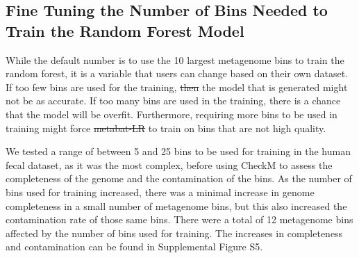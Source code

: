 \documentclass[fleqn,10pt,lineno]{wlpeerj}
\providecommand{\DIFaddtex}[1]{{\protect\color{blue}\uwave{#1}}} %
\providecommand{\DIFdeltex}[1]{{\protect\color{red}\sout{#1}}}                      %
\providecommand{\DIFaddbegin}{} %
\providecommand{\DIFaddend}{} %
\providecommand{\DIFdelbegin}{} %
\providecommand{\DIFdelend}{} %
\providecommand{\DIFadd}[1]{\texorpdfstring{\DIFaddtex{#1}}{#1}} %
\providecommand{\DIFdel}[1]{\texorpdfstring{\DIFdeltex{#1}}{}} %
\newcommand{\DIFscaledelfig}{0.5}
\newlength{\DIFdelgraphicswidth} %
\newlength{\DIFdelgraphicsheight} %
\newcommand{\DIFaddincludegraphics}[2][]{{\color{blue}\fbox{\DIFOincludegraphics[#1]{#2}}}} %
\newcommand{\DIFdelincludegraphics}[2][]{%
\sbox{\DIFdelgraphicsbox}{\DIFOincludegraphics[#1]{#2}}%
\settoboxwidth{\DIFdelgraphicswidth}{\DIFdelgraphicsbox} %
\settoboxtotalheight{\DIFdelgraphicsheight}{\DIFdelgraphicsbox} %
\scalebox{\DIFscaledelfig}{%
\parbox[b]{\DIFdelgraphicswidth}{\usebox{\DIFdelgraphicsbox}\\[-\baselineskip] \rule{\DIFdelgraphicswidth}{0em}}\llap{\resizebox{\DIFdelgraphicswidth}{\DIFdelgraphicsheight}{%
\setlength{\unitlength}{\DIFdelgraphicswidth}%
\begin{picture}(1,1)%
\thicklines\linethickness{2pt} %
{\color[rgb]{1,0,0}\put(0,0){\framebox(1,1){}}}%
{\color[rgb]{1,0,0}\put(0,0){\line( 1,1){1}}}%
{\color[rgb]{1,0,0}\put(0,1){\line(1,-1){1}}}%
\end{picture}%
}\hspace*{3pt}}} %
} %
\DeclareRobustCommand{\DIFaddbegin}{\DIFOaddbegin \let\includegraphics\DIFaddincludegraphics} %
\DeclareRobustCommand{\DIFaddend}{\DIFOaddend \let\includegraphics\DIFOincludegraphics} %
\DeclareRobustCommand{\DIFdelbegin}{\DIFOdelbegin \let\includegraphics\DIFdelincludegraphics} %
\DeclareRobustCommand{\DIFdelend}{\DIFOaddend \let\includegraphics\DIFOincludegraphics} %
\begin{document}
\subsection*{Fine Tuning the Number of Bins Needed to Train the Random Forest Model}
While the default number is to use the 10 largest metagenome bins to train the random forest, it is a variable that users can change based on their own dataset. If too few bins are used for the training, \DIFdelbegin \DIFdel{then }\DIFdelend the model that is generated might not be as accurate. If too many bins are used in the training, there is a chance that the model will be overfit. Furthermore, requiring more bins to be used in training might force \DIFdelbegin \DIFdel{metabat-LR }\DIFdelend \DIFaddbegin \DIFadd{metaBAT-LR }\DIFaddend to train on bins that are not high quality. 

We tested a range of between 5 and 25 bins to be used for training in the human fecal dataset, as it was the most complex, before using CheckM to assess the completeness of the genome and the contamination of the bins.  As the number of bins used for training increased, there was a minimal increase in genome completeness in a small number of metagenome bins, but this also increased the contamination rate of those same bins. There were a total of 12 metagenome bins affected by the number of bins used for training. The increases in completeness and contamination can be found in Supplemental Figure S5.     
\end{document}
